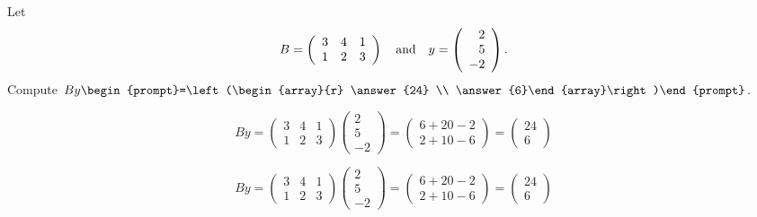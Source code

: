 \documentclass{ximera}
\begin{document}
\begin{exercise} \label{c4.1.2}
Let
\[
B=\left(\begin{array}{ccc} 3 & 4 & 1\\ 1& 2 & 3 \end{array}\right)
\quad\mbox{and}\quad y=\left(\begin{array}{r} 2 \\ 5 \\ -2 \end{array}\right).
\]
Compute $By\begin{prompt}=\left(\begin{array}{r} \answer{24} \\ \answer{6}\end{array}\right)\end{prompt}$.
\begin{hint}
  \[
By =
\left(\begin{array}{rrr} 3 & 4 & 1 \\ 1 & 2 & 3\end{array}\right)
\left(\begin{array}{r} 2 \\ 5 \\ -2\end{array}\right) = 
\left(\begin{array}{r} 6 + 20 - 2 \\ 2 + 10 - 6\end{array}\right) =
\left(\begin{array}{r} 24 \\ 6\end{array}\right)
\]
\end{hint}

\begin{solution}

\[
By =
\left(\begin{array}{rrr} 3 & 4 & 1 \\ 1 & 2 & 3\end{array}\right)
\left(\begin{array}{r} 2 \\ 5 \\ -2\end{array}\right) = 
\left(\begin{array}{r} 6 + 20 - 2 \\ 2 + 10 - 6\end{array}\right) =
\left(\begin{array}{r} 24 \\ 6\end{array}\right)
\]

\end{solution}
\end{exercise}
\end{document}
